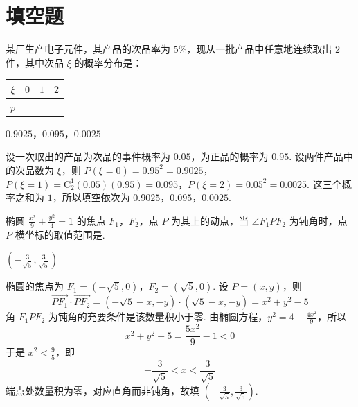 \section{填空题}
\begin{problem}
某厂生产电子元件，其产品的次品率为 \(5\%\)，现从一批产品中任意地连续取出 \(2\) 件，其中次品 \(\xi\) 的概率分布是：

\begin{center}
\begin{tabular}{|c|c|c|c|}
\hline
\(\xi\) & \(0\) & \(1\) & \(2\) \\
\hline
\(p\) &\fillinblank{}&\fillinblank{}&\fillinblank{}\\
\hline
\end{tabular}
\end{center}
\end{problem}

\begin{answer}
\(0.9025\)，\(0.095\)，\(0.0025\)
\end{answer}

\begin{solution}
设一次取出的产品为次品的事件概率为 \(0.05\)，为正品的概率为 \(0.95\). 设两件产品中的次品数为 \(\xi\)，则
\(P(\xi=0)=0.95^{2}=0.9025\)，\(P(\xi=1)=\mathrm C_{2}^{1}(0.05)(0.95)=0.095\)，\(P(\xi=2)=0.05^{2}=0.0025\).
这三个概率之和为 \(1\)，所以填空依次为 \(0.9025\)，\(0.095\)，\(0.0025\).
\end{solution}

\begin{problem}
椭圆 \(\frac{x^{2}}{9} + \frac{y^{2}}{4} = 1\) 的焦点 \(F_{1}\)，\(F_{2}\)，点 \(P\) 为其上的动点，当 \(\angle F_{1}PF_{2}\) 为钝角时，点 \(P\) 横坐标的取值范围是\fillinblank{}.
\end{problem}

\begin{answer}
\(\left(-\frac{3}{\sqrt{5}},\frac{3}{\sqrt{5}}\right)\)
\end{answer}

\begin{solution}
椭圆的焦点为 \(F_{1}=(-\sqrt{5},0)\)，\(F_{2}=(\sqrt{5},0)\). 设 \(P=(x,y)\)，则
\[
\overrightarrow{PF_{1}}\cdot\overrightarrow{PF_{2}}
=(-\sqrt{5}-x,-y)\cdot(\sqrt{5}-x,-y)
=x^{2}+y^{2}-5
\]
角 \(F_{1}PF_{2}\) 为钝角的充要条件是该数量积小于零. 由椭圆方程，\(y^{2}=4-\frac{4x^{2}}{9}\)，所以
\[
x^{2}+y^{2}-5=\frac{5x^{2}}{9}-1<0
\]
于是 \(x^{2}<\frac{9}{5}\)，即
\[
-\frac{3}{\sqrt{5}}<x<\frac{3}{\sqrt{5}}
\]
端点处数量积为零，对应直角而非钝角，故填 \(\left(-\frac{3}{\sqrt{5}},\frac{3}{\sqrt{5}}\right)\).
\end{solution}

